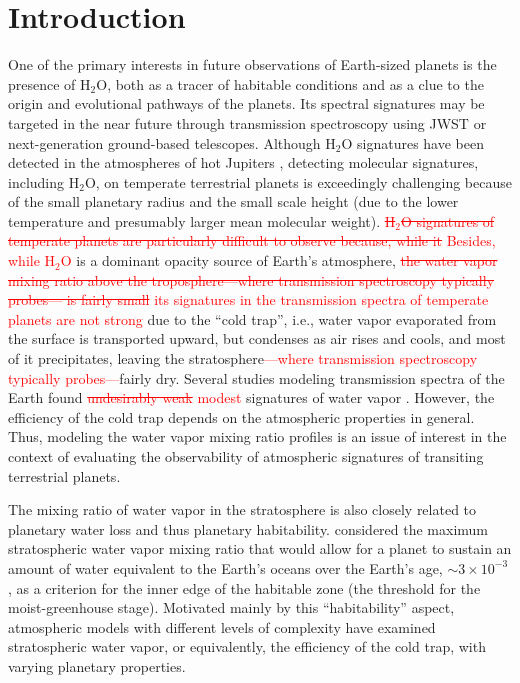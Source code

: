 \documentclass[11pt,numberedappendix,twocolappendix,]{emulateapj}
\def\water{H$_2$O}
\def\wv{water vapor}
\def\addYF#1{\textcolor{red}{#1}}
\def\changeYF#1#2{\textcolor{red}{\sout{#1} #2}}
\begin{document}



\section{Introduction}
\label{s:intro}

One of the primary interests in future observations of Earth-sized planets is the presence of \water{}, both as a tracer of habitable conditions and as a clue to the origin and evolutional pathways of the planets. 
Its spectral signatures may be targeted in the near future through transmission spectroscopy using JWST or next-generation ground-based telescopes.
%
Although \water{} signatures have been detected in the atmospheres of hot Jupiters \citep[e.g.][]{Tinetti2007,Sing2016}, detecting molecular signatures, including \water{}, on temperate terrestrial planets is exceedingly challenging \citep{Cowan2015} because of the small planetary radius and the small scale height (due to the lower temperature and presumably larger mean molecular weight). 
\changeYF{ \water{} signatures of temperate planets are particularly difficult to observe because, while it}{Besides, while \water{} } is a dominant opacity source of Earth's atmosphere, \changeYF{the \wv{} mixing ratio above the troposphere---where transmission spectroscopy typically probes--- is fairly small}{its signatures in the transmission spectra of temperate planets are not strong} due to the ``cold trap'', i.e., \wv{} evaporated from the surface is transported upward, but condenses as air rises and cools, and most of it precipitates, leaving the stratosphere\addYF{---where transmission spectroscopy typically probes---}fairly dry. 
Several studies modeling transmission spectra of the Earth found \changeYF{undesirably weak}{modest} signatures of \wv{} \citep[e.g.][]{Ehrenreich2006, Kaltenegger2009, Betremieux2013, Misra2014}. 
However, the efficiency of the cold trap depends on the atmospheric properties in general. 
Thus, modeling the \wv{} mixing ratio profiles is an issue of interest in the context of evaluating the observability of atmospheric signatures of transiting terrestrial planets. 

The mixing ratio of \wv{} in the stratosphere is also closely related to planetary water loss and thus planetary habitability. 
\citet{Kasting1993} considered the maximum stratospheric \wv{} mixing ratio that would allow for a planet to sustain an amount of water equivalent to the  Earth's oceans over the Earth's age, $\sim 3 \times 10^{-3}$, as a criterion for the inner edge of the habitable zone (the threshold for the moist-greenhouse stage). 
Motivated mainly by this ``habitability'' aspect, atmospheric models with different levels of complexity have examined stratospheric \wv{}, or equivalently, the efficiency of the cold trap, with varying planetary properties. 
\end{document}
